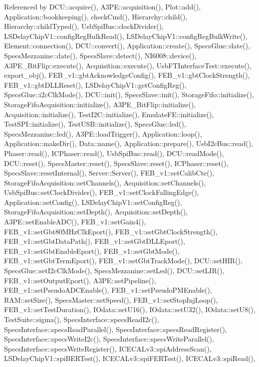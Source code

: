 Referenced by D\+C\+U\+::acquire(), A3\+P\+E\+::acquisition(), Plot\+::add(), Application\+::bookkeeping(), check\+Cmd(), Hierarchy\+::child(), Hierarchy\+::child\+Typed(), Usb\+Spi\+Bus\+::clock\+Divider(), L\+S\+Delay\+Chip\+V1\+::config\+Reg\+Bulk\+Read(), L\+S\+Delay\+Chip\+V1\+::config\+Reg\+Bulk\+Write(), Element\+::connection(), D\+C\+U\+::convert(), Application\+::create(), Specs\+Glue\+::date(), Specs\+Mezzanine\+::date(), Specs\+Slave\+::detect(), N\+I6008\+::device(), A3\+P\+E\+\_\+\+Bit\+Flip\+::execute(), Acquisition\+::execute(), Usb\+F\+T\+Interface\+Test\+::execute(), export\+\_\+obj(), F\+E\+B\+\_\+v1\+::gbt\+Acknowledge\+Config(), F\+E\+B\+\_\+v1\+::gbt\+Clock\+Strength(), F\+E\+B\+\_\+v1\+::gbt\+D\+L\+L\+Reset(), L\+S\+Delay\+Chip\+V1\+::get\+Config\+Reg(), Specs\+Glue\+::i2c\+Clk\+Mode(), D\+C\+U\+::init(), Specs\+Slave\+::init(), Storage\+Fifo\+::initialize(), Storage\+Fifo\+Acquisition\+::initialize(), A3\+P\+E\+\_\+\+Bit\+Flip\+::initialize(), Acquisition\+::initialize(), Test\+I2\+C\+::initialize(), Emulate\+F\+E\+::initialize(), Test\+S\+P\+I\+::initialize(), Test\+U\+S\+B\+::initialize(), Specs\+Glue\+::led(), Specs\+Mezzanine\+::led(), A3\+P\+E\+::load\+Trigger(), Application\+::loop(), Application\+::make\+Dir(), Data\+::name(), Application\+::prepare(), Usb\+I2c\+Bus\+::read(), Phaser\+::read(), I\+C\+Phaser\+::read(), Usb\+Spi\+Bus\+::read(), D\+C\+U\+::read\+Mode(), D\+C\+U\+::reset(), Specs\+Master\+::reset(), Specs\+Slave\+::reset(), I\+C\+Phaser\+::reset(), Specs\+Slave\+::reset\+Internal(), Server\+::\+Server(), F\+E\+B\+\_\+v1\+::set\+Calib\+Cte(), Storage\+Fifo\+Acquisition\+::set\+Channels(), Acquisition\+::set\+Channels(), Usb\+Spi\+Bus\+::set\+Clock\+Divider(), F\+E\+B\+\_\+v1\+::set\+Clock\+Falling\+Edge(), Application\+::set\+Config(), L\+S\+Delay\+Chip\+V1\+::set\+Config\+Reg(), Storage\+Fifo\+Acquisition\+::set\+Depth(), Acquisition\+::set\+Depth(), A3\+P\+E\+::set\+Enable\+A\+D\+C(), F\+E\+B\+\_\+v1\+::set\+Gain4(), F\+E\+B\+\_\+v1\+::set\+Gbt80\+M\+Hz\+Clk\+Eport(), F\+E\+B\+\_\+v1\+::set\+Gbt\+Clock\+Strength(), F\+E\+B\+\_\+v1\+::set\+Gbt\+Data\+Path(), F\+E\+B\+\_\+v1\+::set\+Gbt\+D\+L\+L\+Eport(), F\+E\+B\+\_\+v1\+::set\+Gbt\+Enable\+Eport(), F\+E\+B\+\_\+v1\+::set\+Gbt\+Mode(), F\+E\+B\+\_\+v1\+::set\+Gbt\+Term\+Eport(), F\+E\+B\+\_\+v1\+::set\+Gbt\+Track\+Mode(), D\+C\+U\+::set\+H\+I\+R(), Specs\+Glue\+::set\+I2c\+Clk\+Mode(), Specs\+Mezzanine\+::set\+Led(), D\+C\+U\+::set\+L\+I\+R(), F\+E\+B\+\_\+v1\+::set\+Output\+Eport(), A3\+P\+E\+::set\+Pipeline(), F\+E\+B\+\_\+v1\+::set\+Pseudo\+A\+D\+C\+Enable(), F\+E\+B\+\_\+v1\+::set\+Pseudo\+P\+M\+Enable(), R\+A\+M\+::set\+Size(), Specs\+Master\+::set\+Speed(), F\+E\+B\+\_\+v1\+::set\+Stop\+Inj\+Loop(), F\+E\+B\+\_\+v1\+::set\+Test\+Duration(), I\+Odata\+::set\+U16(), I\+Odata\+::set\+U32(), I\+Odata\+::set\+U8(), Test\+Suite\+::sigma(), Specs\+Interface\+::specs\+Read\+I2c(), Specs\+Interface\+::specs\+Read\+Parallel(), Specs\+Interface\+::specs\+Read\+Register(), Specs\+Interface\+::specs\+Write\+I2c(), Specs\+Interface\+::specs\+Write\+Parallel(), Specs\+Interface\+::specs\+Write\+Register(), I\+C\+E\+C\+A\+Lv3\+::spi\+Address\+Scan(), L\+S\+Delay\+Chip\+V1\+::spi\+B\+E\+R\+Test(), I\+C\+E\+C\+A\+Lv3\+::spi\+F\+E\+R\+Test(), I\+C\+E\+C\+A\+Lv3\+::spi\+Read(), 